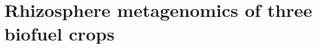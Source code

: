 \documentclass[]{msu-thesis}
\begin{document}
\chapter{Rhizosphere metagenomics of three biofuel crops}
%
%
%
%
%
%
\end{document}
